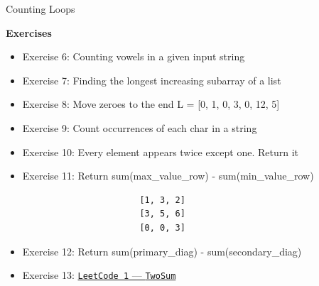 \documentclass[
	11pt, 
]{beamer}
\begin{document}

\begin{frame}[fragile]{Counting Loops}
\small
\begin{alertblock}{\textbf{Exercises}}
\begin{itemize}
    \item Exercise 6: Counting vowels in a given input string
    \item Exercise 7: Finding the longest increasing subarray of a list
    \item Exercise 8: Move zeroes to the end L = [0, 1, 0, 3, 0, 12, 5]
    \item Exercise 9: Count occurrences of each char in a string
    \item Exercise 10: Every element appears twice except one. Return it
    \item Exercise 11: Return sum(max\_value\_row) - sum(min\_value\_row) 
    \begin{verbatim}
                       [1, 3, 2]
                       [3, 5, 6]
                       [0, 0, 3]\end{verbatim} 
    \item Exercise 12: Return sum(primary\_diag) - sum(secondary\_diag)
    \item Exercise 13:  \href{https://leetcode.com/problems/two-sum/}{\texttt{LeetCode 1} --- \texttt{TwoSum}}
                       
\end{itemize}    
\end{alertblock}
\end{frame}

\end{document}
